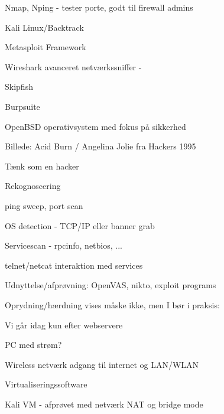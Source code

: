 \documentclass[20pt,landscape,a4paper,footrule]{foils}
\begin{document}


\begin{list2}
\item Nmap, Nping - tester porte, godt til firewall admins 
\item Kali Linux/Backtrack 
\item Metasploit Framework 
\item Wireshark avanceret netværkssniffer - 
\item Skipfish 
\item Burpsuite 
\item OpenBSD operativsystem med fokus
  på sikkerhed  
\end{list2}

Billede: Acid Burn / Angelina Jolie fra Hackers 1995

%

\begin{list1}
\item Tænk som en hacker
\item Rekognoscering
\begin{list2}
\item ping sweep, port scan
\item OS detection - TCP/IP eller banner grab
\item Servicescan - rpcinfo, netbios, ...
\item telnet/netcat interaktion med services
\end{list2}
\item Udnyttelse/afprøvning: OpenVAS, nikto, exploit programs
\item Oprydning/hærdning vises måske ikke, men I bør i praksis:
\end{list1}

\vskip 2cm
\centerline{\hlkbig Vi går idag kun efter webservere}



\begin{list1}
\item PC med strøm?
\item Wireless netværk adgang til internet og LAN/WLAN
\item Virtualiseringssoftware
\item Kali VM - afprøvet med netværk NAT og bridge mode
\end{list1}
\end{document}
